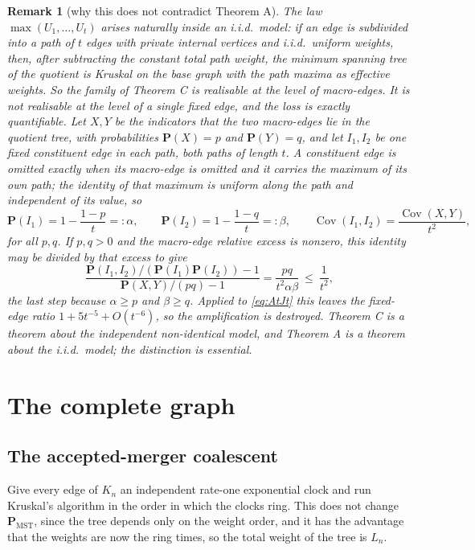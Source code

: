 \documentclass[10pt,a4paper]{amsart}
\newtheorem{remark}[theorem]{Remark}
\newcommand{\PMST}{\mathbf{P}_{\mathrm{MST}}}
\newcommand{\PP}{\mathbf{P}}
\begin{document}
\begin{remark}[why this does not contradict Theorem A]
\label{rem:attenuation}
The law $\max(U_1,\dots,U_t)$ arises naturally inside an i.i.d.\ model: if an edge
is subdivided into a path of $t$ edges with private internal vertices and i.i.d.\
uniform weights, then, after subtracting the constant total path weight, the
minimum spanning tree of the quotient is Kruskal on the base graph with the path
\emph{maxima} as effective weights. So the family of Theorem C is realisable at
the level of \emph{macro-edges}. It is not realisable at the level of a single
fixed edge, and the loss is exactly quantifiable. Let $X,Y$ be the indicators
that the two macro-edges lie in the quotient tree, with probabilities
$\PP(X)=p$ and $\PP(Y)=q$, and let $I_1,I_2$ be one fixed constituent edge in
each path, both paths of length $t$. A constituent edge is omitted exactly when
its macro-edge is omitted \emph{and} it carries the maximum of its own path; the
identity of that maximum is uniform along the path and independent of its value,
so
\[
\PP(I_1)=1-\frac{1-p}t=:\alpha,\qquad
\PP(I_2)=1-\frac{1-q}t=:\beta,\qquad
\operatorname{Cov}(I_1,I_2)=\frac{\operatorname{Cov}(X,Y)}{t^2},
\]
for all $p,q$. If $p,q>0$ and the macro-edge relative excess is nonzero, this
identity may be divided by that excess to give
\[
\frac{\PP(I_1,I_2)/(\PP(I_1)\PP(I_2))-1}{\PP(X,Y)/(pq)-1}
=\frac{pq}{t^2\alpha\beta}\ \le\ \frac1{t^2},
\]
the last step because $\alpha\ge p$ and $\beta\ge q$.
Applied to \eqref{eq:AtJt} this leaves the fixed-edge ratio
$1+5t^{-5}+O(t^{-6})$, so the amplification is destroyed. Theorem C is a theorem
about the independent non-identical model, and Theorem A is a theorem about the
i.i.d.\ model; the distinction is essential.
\end{remark}

\section{The complete graph}
\label{sec:kn}

\subsection{The accepted-merger coalescent}

Give every edge of $K_n$ an independent rate-one exponential clock and run
Kruskal's algorithm in the order in which the clocks ring. This does not change
$\PMST$, since the tree depends only on the weight order, and it has the
advantage that the weights are now the ring times, so the total weight of the
tree is $L_n$.
\end{document}
